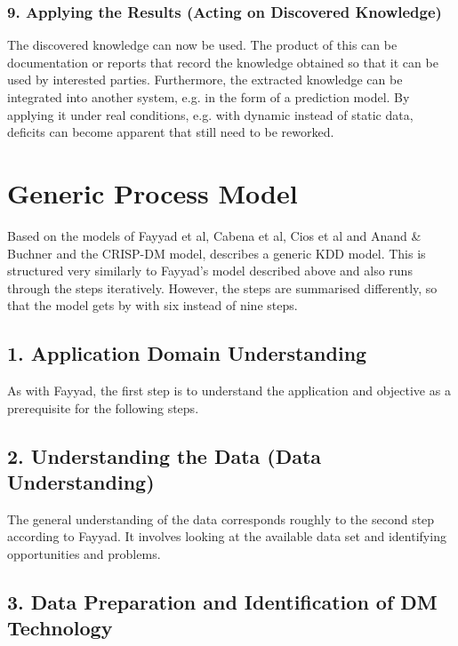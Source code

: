 \subsubsection{9. Applying the Results (Acting on Discovered Knowledge)}

The discovered knowledge can now be used. The product of this can be documentation or reports that record the knowledge obtained so that it can be used by interested parties. Furthermore, the extracted knowledge can be integrated into another system, e.g. in the form of a prediction model. By applying it under real conditions, e.g. with dynamic instead of static data, deficits can become apparent that still need to be reworked. \cite{Fayyad:1996,Maimon:2010}

\section{Generic Process Model}

Based on the models of Fayyad et al, Cabena et al, Cios et al and Anand \& Buchner and the CRISP-DM model, \cite{Kurgan:2006} describes a generic KDD model. This is structured very similarly to Fayyad's model described above and also runs through the steps iteratively. However, the steps are summarised differently, so that the model gets by with six instead of nine steps. 

\subsection{1. Application Domain Understanding}

As with Fayyad, the first step is to understand the application and objective as a prerequisite for the following steps.

\subsection{2. Understanding the Data (Data Understanding)}

The general understanding of the data corresponds roughly to the second step according to Fayyad. It involves looking at the available data set and identifying opportunities and problems.

\subsection{3. Data Preparation and Identification of DM Technology}

